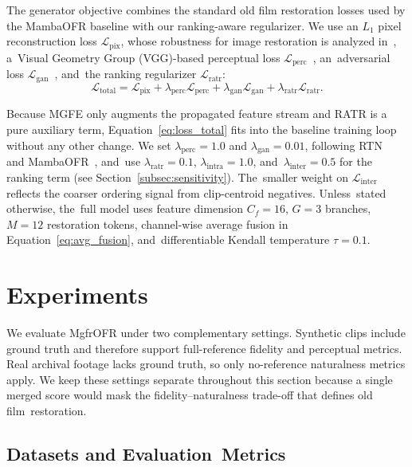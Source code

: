\documentclass[symmetry,article,accept,pdftex,moreauthors]{Definitions/mdpi}
\begin{document}
The generator objective combines the standard old film restoration losses used by the MambaOFR baseline with our ranking-aware regularizer. We use an $L_1$ pixel reconstruction loss $\mathcal{L}_{\mathrm{pix}}$, whose robustness for image restoration is analyzed in~\cite{zhao2017loss_restoration}, a~Visual Geometry Group (VGG)-based perceptual loss $\mathcal{L}_{\mathrm{perc}}$~\cite{johnson2016perceptual}, an~adversarial loss $\mathcal{L}_{\mathrm{gan}}$~\cite{goodfellow2014gan}, and~the ranking regularizer $\mathcal{L}_{\mathrm{ratr}}$:
\begin{equation}
\mathcal{L}_{\mathrm{total}} =
\mathcal{L}_{\mathrm{pix}}
+ \lambda_{\mathrm{perc}}\mathcal{L}_{\mathrm{perc}}
+ \lambda_{\mathrm{gan}}\mathcal{L}_{\mathrm{gan}}
+ \lambda_{\mathrm{ratr}}\mathcal{L}_{\mathrm{ratr}}.
\label{eq:loss_total}
\end{equation}

Because MGFE only augments the propagated feature stream and RATR is a pure auxiliary term, Equation~\eqref{eq:loss_total} fits into the baseline training loop without any other change. We set $\lambda_{\mathrm{perc}}=1.0$ and $\lambda_{\mathrm{gan}}=0.01$, following RTN~\cite{wan2022rtn} and MambaOFR~\cite{mao2025mambaofr}, and~use \mbox{$\lambda_{\mathrm{ratr}}=0.1$}, $\lambda_{\mathrm{intra}}=1.0$, and~$\lambda_{\mathrm{inter}}=0.5$ for the ranking term (see Section~\ref{subsec:sensitivity}). The~smaller weight on $\mathcal{L}_{\text{inter}}$ reflects the coarser ordering signal from clip-centroid negatives. Unless~stated otherwise, the~full model uses feature dimension $C_f=16$, $G=3$ branches, $M=12$ restoration tokens, channel-wise average fusion in Equation~\eqref{eq:avg_fusion}, and~differentiable Kendall temperature $\tau=0.1$.

%
\section{Experiments}
\label{sec:experiment}

We evaluate MgfrOFR under two complementary settings. Synthetic clips include ground truth and therefore support full-reference fidelity and perceptual metrics. Real archival footage lacks ground truth, so only no-reference naturalness metrics apply. We keep these settings separate throughout this section because a single merged score would mask the fidelity--naturalness trade-off that defines old film~restoration.

\subsection{Datasets and Evaluation~Metrics}
\label{subsec:datasets_metrics}
\end{document}
